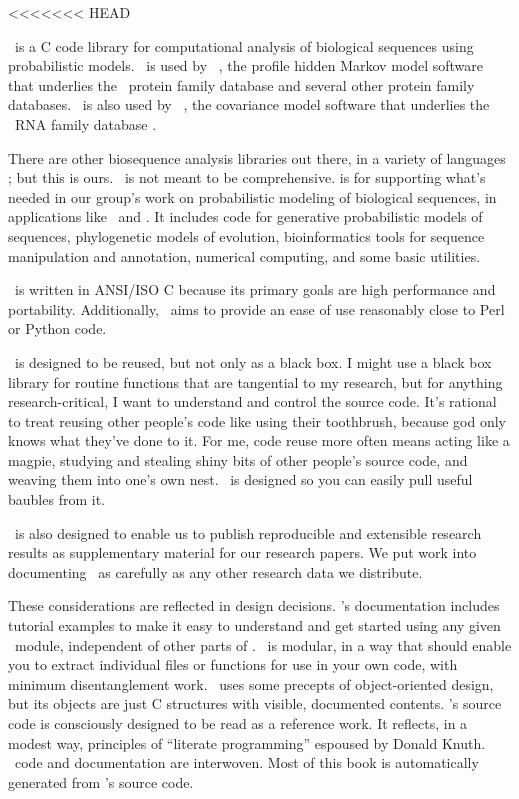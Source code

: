<<<<<<< HEAD


\Easel\ is a C code library for computational analysis of biological
sequences using probabilistic models. \Easel\ is used by \HMMER\ 
\citep{hmmer,Eddy98}, the profile hidden Markov model software that
underlies the \Pfam\ protein family database
\citep{Finn06,Sonnhammer97} and several other protein family
databases. \Easel\ is also used by \Infernal\ 
\citep{infernal,NawrockiEddy07}, the covariance model software that
underlies the \Rfam\ RNA family database
\citep{Griffiths-Jones05}. 

There are other biosequence analysis libraries out there, in a variety
of languages
\citep{Vahrson96,Pitt01,Mangalam02,Butt05,Dutheil06,Giancarlo07,Doring08};
but this is ours.  \Easel\ is not meant to be comprehensive.  \Easel
is for supporting what's needed in our group's work on probabilistic
modeling of biological sequences, in applications like \HMMER\ and
\Infernal. It includes code for generative probabilistic models of
sequences, phylogenetic models of evolution, bioinformatics tools for
sequence manipulation and annotation, numerical computing, and some
basic utilities.

\Easel\ is written in ANSI/ISO C because its primary goals are high
performance and portability. Additionally, \Easel\ aims to provide an
ease of use reasonably close to Perl or Python code.

\Easel\ is designed to be reused, but not only as a black box. I might
use a black box library for routine functions that are tangential to
my research, but for anything research-critical, I want to understand
and control the source code.  It's rational to treat reusing other
people's code like using their toothbrush, because god only knows what
they've done to it. For me, code reuse more often means acting like a
magpie, studying and stealing shiny bits of other people's source
code, and weaving them into one's own nest. \Easel\ is designed so you
can easily pull useful baubles from it.

\Easel\ is also designed to enable us to publish reproducible and
extensible research results as supplementary material for our research
papers. We put work into documenting \Easel\ as carefully as any other
research data we distribute.

These considerations are reflected in \Easel design decisions.
\Easel's documentation includes tutorial examples to make it easy to
understand and get started using any given \Easel\ module, independent
of other parts of \Easel.  \Easel\ is modular, in a way that should
enable you to extract individual files or functions for use in your
own code, with minimum disentanglement work. \Easel\ uses some
precepts of object-oriented design, but its objects are just C
structures with visible, documented contents. \Easel's source code is
consciously designed to be read as a reference work. It reflects, in a
modest way, principles of ``literate programming'' espoused by Donald
Knuth. \Easel\ code and documentation are interwoven. Most of this
book is automatically generated from \Easel's source code.



